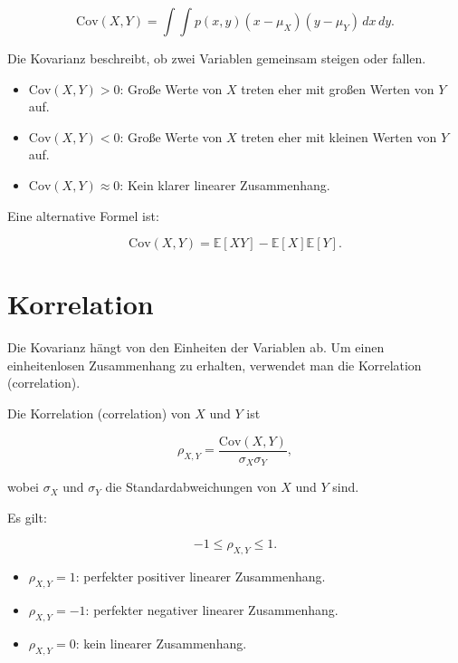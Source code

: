 \[
    \mathrm{Cov}(X,Y)
    =
    \int
    \int
    p(x,y)
    (x-\mu_X)(y-\mu_Y)
    \,dx\,dy.
\]

\begin{conceptbox}
Die Kovarianz beschreibt, ob zwei Variablen gemeinsam steigen oder fallen.

\begin{itemize}
    \item \(\mathrm{Cov}(X,Y) > 0\): Große Werte von \(X\) treten eher mit großen Werten von \(Y\) auf.
    \item \(\mathrm{Cov}(X,Y) < 0\): Große Werte von \(X\) treten eher mit kleinen Werten von \(Y\) auf.
    \item \(\mathrm{Cov}(X,Y) \approx 0\): Kein klarer linearer Zusammenhang.
\end{itemize}
\end{conceptbox}

Eine alternative Formel ist:

\[
    \mathrm{Cov}(X,Y)
    =
    \mathbb{E}[XY]
    -
    \mathbb{E}[X]\mathbb{E}[Y].
\]

\section{Korrelation}

Die Kovarianz hängt von den Einheiten der Variablen ab.
Um einen einheitenlosen Zusammenhang zu erhalten, verwendet man die Korrelation (correlation).

\begin{definitionbox}
Die Korrelation (correlation) von \(X\) und \(Y\) ist

\[
    \rho_{X,Y}
    =
    \frac{
        \mathrm{Cov}(X,Y)
    }{
        \sigma_X \sigma_Y
    },
\]

wobei \(\sigma_X\) und \(\sigma_Y\) die Standardabweichungen von \(X\) und \(Y\) sind.
\end{definitionbox}

Es gilt:

\[
    -1 \leq \rho_{X,Y} \leq 1.
\]

\begin{itemize}
    \item \(\rho_{X,Y} = 1\): perfekter positiver linearer Zusammenhang.
    \item \(\rho_{X,Y} = -1\): perfekter negativer linearer Zusammenhang.
    \item \(\rho_{X,Y} = 0\): kein linearer Zusammenhang.
\end{itemize}

